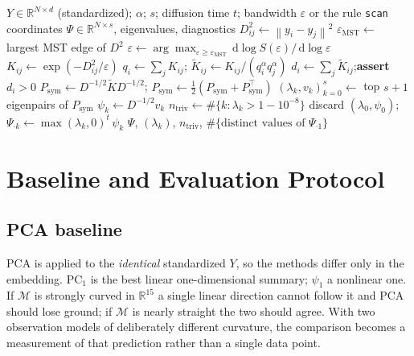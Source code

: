 \documentclass[11pt]{article}
\newcommand{\R}{\mathbb{R}}
\newcommand{\dd}{\,\mathrm{d}}
\newcommand{\eps}{\varepsilon}
\newcommand{\Kt}{\widetilde{K}}
\newcommand{\norm}[1]{\left\lVert #1 \right\rVert}
\begin{document}
\begin{algorithm}[t]
\caption{Diffusion map with anisotropic normalization}
\label{alg:dm}
\begin{algorithmic}[1]
\Require $Y\in\R^{N\times d}$ (standardized); $\alpha$; $s$; diffusion time $t$;
         bandwidth $\eps$ or the rule \texttt{scan}
\Ensure  coordinates $\Psi\in\R^{N\times s}$, eigenvalues, diagnostics
\State $D^2_{ij}\gets\norm{y_i-y_j}^2$
\If{$\eps = \texttt{scan}$}
  \State $\eps_{\mathrm{MST}}\gets$ largest MST edge of $D^2$
  \State $\eps\gets\arg\max_{\eps\ge\eps_{\mathrm{MST}}}
         \dd\log S(\eps)/\dd\log\eps$
\EndIf
\State $K_{ij}\gets\exp(-D^2_{ij}/\eps)$
\State $q_i\gets\sum_j K_{ij}$;\quad
       $\Kt_{ij}\gets K_{ij}/(q_i^\alpha q_j^\alpha)$
\State $d_i\gets\sum_j\Kt_{ij}$;\quad \textbf{assert} $d_i>0$
\State $P_{\mathrm{sym}}\gets D^{-1/2}\Kt D^{-1/2}$;\quad
       $P_{\mathrm{sym}}\gets\tfrac12(P_{\mathrm{sym}}+P_{\mathrm{sym}}^\top)$
\State $(\lambda_k,v_k)_{k=0}^s\gets$ top $s{+}1$ eigenpairs of
       $P_{\mathrm{sym}}$ 
\State $\psi_k\gets D^{-1/2}v_k$ 
\State $n_{\mathrm{triv}}\gets\#\{k:\lambda_k>1-10^{-8}\}$
\State discard $(\lambda_0,\psi_0)$; \quad
       $\Psi_{\cdot k}\gets\max(\lambda_k,0)^t\,\psi_k$
\State \Return $\Psi$, $(\lambda_k)$, $n_{\mathrm{triv}}$,
       $\#\{\text{distinct values of }\Psi_{\cdot1}\}$
\end{algorithmic}
\end{algorithm}

\section{Baseline and Evaluation Protocol}
\label{sec:eval}

\subsection{PCA baseline}

PCA is applied to the \emph{identical} standardized $Y$, so the methods differ
only in the embedding. PC$_1$ is the best linear one-dimensional summary;
$\psi_1$ a nonlinear one. If $\mathcal{M}$ is strongly curved in $\R^{15}$ a
single linear direction cannot follow it and PCA should lose ground; if
$\mathcal{M}$ is nearly straight the two should agree. With two observation
models of deliberately different curvature, the comparison becomes a measurement
of that prediction rather than a single data point.
\end{document}
